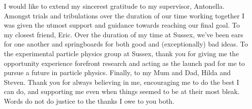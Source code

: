 I would like to extend my sincerest gratitude to my supervisor, Antonella.
Amongst trials and tribulations over the duration of our time working together I was given the utmost support and guidance towards reaching our final goal.
To my closest friend, Eric.
Over the duration of my time at Sussex, we've been ears for one another and springboards for both good and (exceptionally) bad ideas.
To the experimental particle physics group at Sussex, thank you for giving me the opportunity experience forefront research and acting as the launch pad for me to pursue a future in particle physics.
Finally, to my Mum and Dad, Hilda and Steven.
Thank you for always believing in me, encouraging me to do the best I can do, and supporting me even when things seemed to be at their most bleak.
Words do not do justice to the thanks I owe to you both. 